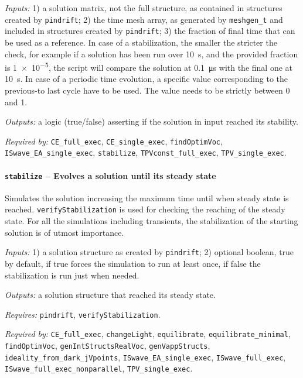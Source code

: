 \textit{Inputs:} 1) a solution matrix, not the full structure, as contained in
     structures created by \texttt{pin\-drift};
   2) the time mesh array, as generated by \texttt{meshgen\_t} and included
     in structures created by \texttt{pin\-drift};
   3) the fraction of final time that can be used as a
     reference. In case of a stabilization, the smaller the stricter the
     check, for example if a solution has been run over \SI{10}{\s}, and the provided fraction is \num{1e-5}, the script will compare the solution at \SI{0.1}{\us} with the final one at \SI{10}{\s}. In case of a periodic time evolution, a specific value
     corresponding to the previous-to last cycle have to be used. The
     value needs to be strictly between 0 and 1.

\textit{Outputs:} a logic (true/false) asserting if the solution in input reached its stability.


\textit{Required by:} \texttt{CE\_full\_exec}, \texttt{CE\_single\_exec}, \texttt{find\-Optim\-Voc}, \texttt{IS\-wave\_EA\_single\_exec}, \texttt{stabilize}, \texttt{TPV\-const\_full\_exec}, \texttt{TPV\_single\_exec}.

		\paragraph{\texttt{stabilize} -- Evolves a solution until its steady state}
Simulates the solution increasing the maximum time until when steady state is reached. 
\texttt{verify\-Stabilization} is used for checking the reaching of the steady state.
For all the simulations including transients, the stabilization of the starting solution is of utmost importance.

\textit{Inputs:} 1) a solution structure as created by \texttt{pin\-drift};
   2) optional boolean, true by default, 
     if true forces the simulation to run at least once, if false the
     stabilization is run just when needed.
     
\textit{Outputs:} a solution structure that reached its steady state.

\textit{Requires:} \texttt{pin\-drift}, \texttt{verify\-Stabilization}.

\textit{Required by:} \texttt{CE\_full\_exec}, \texttt{change\-Light}, \texttt{equilibrate}, \texttt{equilibrate\_minimal}, \texttt{find\-Optim\-Voc}, \texttt{gen\-Int\-Structs\-Real\-Voc}, \texttt{gen\-Vapp\-Structs}, \texttt{ideality\_from\_dark\_jVpoints}, \texttt{IS\-wave\_EA\_single\_exec}, \texttt{IS\-wave\_full\_exec}, \texttt{IS\-wave\_full\_exec\_nonparallel}, \texttt{TPV\_single\_exec}.

